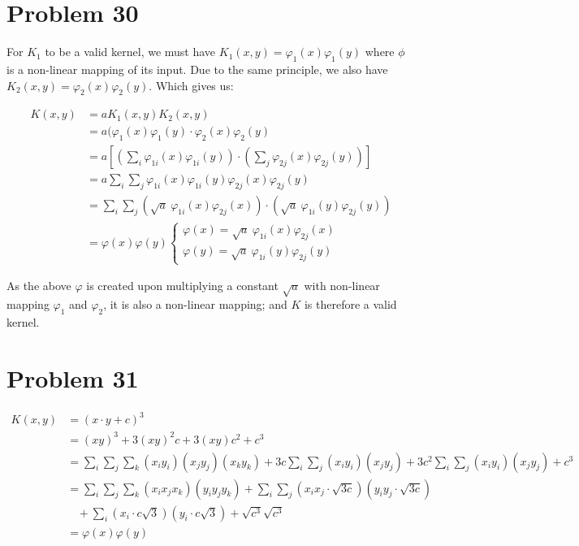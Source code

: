 \documentclass[12pt]{article}
\newcommand{\vphi}{\varphi}
\begin{document}
\section{Problem 30}

For $K_1$ to be a valid kernel, we must have $K_1(x, y) = \vphi_1(x) \vphi_1(y)$ where $\phi$ is a non-linear mapping of its input. Due to the same principle, we also have $K_2(x, y) = \vphi_2(x) \vphi_2(y)$. Which gives us:

\begin{align*}
    K(x, y) &= a K_1(x, y) K_2(x, y) \\
    &= a( \vphi_1(x) \vphi_1(y) \cdot  \vphi_2(x) \vphi_2(y) \\
    &= a[(\sum_{i} \vphi_{1i}(x) \vphi_{1i}(y) ) \cdot (\sum_{j} \vphi_{2j}(x) \vphi_{2j}(y))] \\
    &= a \sum_{i} \sum_{j} \vphi_{1i}(x) \vphi_{1i}(y) \vphi_{2j}(x) \vphi_{2j}(y) \\
    &= \sum_{i} \sum_{j} (\sqrt{a} \  \vphi_{1i}(x) \vphi_{2j}(x) ) \cdot (\sqrt{a} \  \vphi_{1i}(y)\vphi_{2j}(y)) \\
    &= \vphi(x)\vphi(y)
        \begin{cases}
        \vphi(x) = \sqrt{a} \  \vphi_{1i}(x) \vphi_{2j}(x) \\
        \vphi(y) = \sqrt{a} \  \vphi_{1i}(y)\vphi_{2j}(y)
        \end{cases}
\end{align*}

As the above $\vphi$ is created upon multiplying a constant $\sqrt{a}$ with non-linear mapping $\vphi_1$ and $\vphi_2$, it is also a non-linear mapping; and $K$ is therefore a valid kernel.


\section{Problem 31}

\begin{align*}
    K(x, y) &= (x \cdot y + c)^3 \\
    &= (xy)^3 + 3(xy)^2 c + 3(xy)c^2 + c^3 \\
    &= \sum_i \sum_j \sum_k (x_i y_i)(x_j y_j)(x_k y_k) + 3c \sum_i \sum_j (x_i y_i)(x_j y_j) + 3c^2 \sum_i \sum_j (x_i y_i)(x_j y_j) + c^3 \\
    &=  \sum_i \sum_j \sum_k (x_i x_j x_k)(y_i y_j y_k) + \sum_i \sum_j (x_i x_j \cdot \sqrt{3c})(y_i y_j \cdot \sqrt{3c}) \\
    &\ \ \ \  + \sum_i (x_i \cdot c\sqrt{3})(y_i \cdot c\sqrt{3})+ \sqrt{c^3}\sqrt{c^3} \\
    &= \vphi(x)\vphi(y)
\end{align*}
\end{document}
